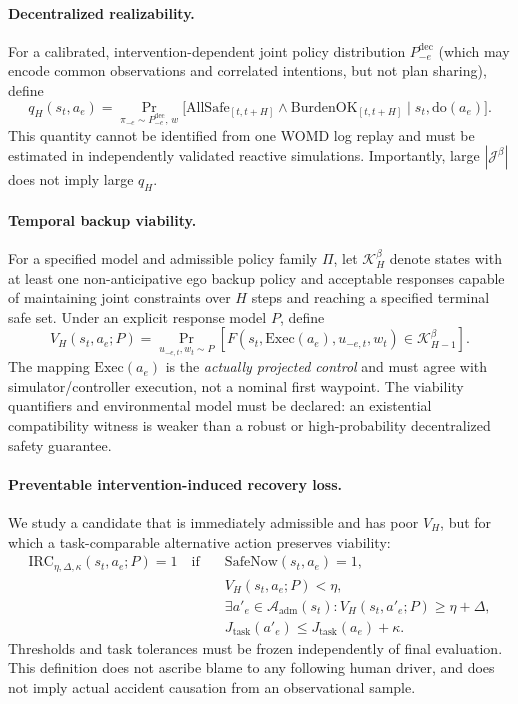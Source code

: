 \documentclass[10pt]{article}
\begin{document}
\paragraph{Decentralized realizability.}
For a calibrated, intervention-dependent joint policy distribution $P_{-e}^{\mathrm{dec}}$ (which may encode common observations and correlated intentions, but not plan sharing), define
\begin{equation}
 q_{H}(s_t,a_e)=\Pr_{\pi_{-e}\sim P_{-e}^{\mathrm{dec}},\,w}\bigl[\mathrm{AllSafe}_{[t,t+H]}\wedge \mathrm{BurdenOK}_{[t,t+H]}\mid s_t,\mathrm{do}(a_e)\bigr].
\label{eq:decentralized_prob}
\end{equation}
This quantity cannot be identified from one WOMD log replay and must be estimated in independently validated reactive simulations. Importantly, large $|\mathcal J^{\beta}|$ does not imply large $q_H$.

\paragraph{Temporal backup viability.}
For a specified model and admissible policy family $\Pi$, let $\mathcal K_{H}^{\beta}$ denote states with at least one non-anticipative ego backup policy and acceptable responses capable of maintaining joint constraints over $H$ steps and reaching a specified terminal safe set. Under an explicit response model $P$, define
\begin{equation}
 V_H(s_t,a_e;P)=\Pr_{u_{-e,t},w_t\sim P}\left[F(s_t,\mathrm{Exec}(a_e),u_{-e,t},w_t)\in\mathcal K_{H-1}^{\beta}\right].
\label{eq:temporal_recoverability}
\end{equation}
The mapping $\mathrm{Exec}(a_e)$ is the \emph{actually projected control} and must agree with simulator/controller execution, not a nominal first waypoint. The viability quantifiers and environmental model must be declared: an existential compatibility witness is weaker than a robust or high-probability decentralized safety guarantee.

\paragraph{Preventable intervention-induced recovery loss.}
We study a candidate that is immediately admissible and has poor $V_H$, but for which a task-comparable alternative action preserves viability:
\begin{align}
 \mathrm{IRC}_{\eta,\Delta,\kappa}(s_t,a_e;P)=1\quad\mathrm{if}\quad &\mathrm{SafeNow}(s_t,a_e)=1,\nonumber\\
 &V_H(s_t,a_e;P)<\eta,\nonumber\\
 &\exists a'_e\in\mathcal A_{\mathrm{adm}}(s_t): V_H(s_t,a'_e;P)\ge\eta+\Delta,\nonumber\\
 &J_{\mathrm{task}}(a'_e)\le J_{\mathrm{task}}(a_e)+\kappa.
 \label{eq:irc_definition}
\end{align}
Thresholds and task tolerances must be frozen independently of final evaluation. This definition does not ascribe blame to any following human driver, and does not imply actual accident causation from an observational sample.
\end{document}

